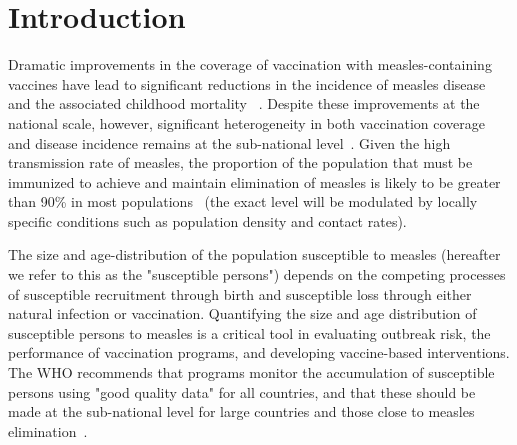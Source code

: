 \documentclass[nofootinbib,aps,pre,twocolumn,superscriptaddress,showkeys,showpacs]{revtex4-1}
\begin{document}
\section{Introduction \label{sec:Intro}}
Dramatic improvements in the coverage of vaccination with measles-containing vaccines have lead to significant reductions in the incidence of measles disease and the associated childhood mortality ~\cite{perry_global_2014}. Despite these improvements at the national scale, however, significant heterogeneity in both vaccination coverage and disease incidence remains at the sub-national level~\cite{prada_demographics_2017,takahashi_geography_2017,metcalf_transport_2015}.
Given the high transmission rate of measles, the proportion of the population that must be immunized to achieve and maintain elimination of measles is likely to be greater than 90\% in most populations~\cite{Goodson2011} (the exact level will be modulated by locally specific conditions such as population density and contact rates).

The size and age-distribution of the population susceptible to measles (hereafter we refer to this as the "susceptible persons") depends on the competing processes of susceptible recruitment through birth and susceptible loss through either natural infection or vaccination. 
Quantifying the size and age distribution of susceptible persons to measles is a critical tool in evaluating outbreak risk, the performance of vaccination programs, and developing vaccine-based interventions. The WHO recommends that programs monitor the accumulation of susceptible persons using "good quality data" for all countries, and that these should be made at the sub-national level for large countries and those close to measles elimination~\cite{WHO2017}.
\end{document}
